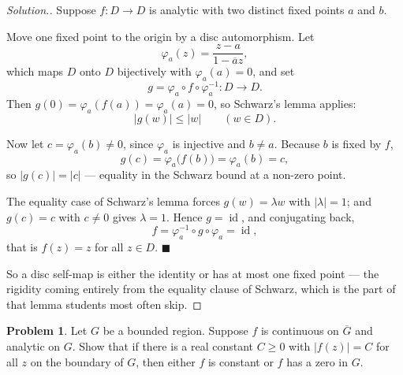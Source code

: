 \documentclass[11pt,a4paper]{article}
\theoremstyle{definition}
\newtheorem{problemx}{Problem}[section]
\newenvironment{problem}{\begin{problemx}}{\end{problemx}}
\newenvironment{solution}
  {\renewcommand{\qedsymbol}{}\begin{proof}[\textit{Solution}.]}
  {\end{proof}}
\begin{document}
\begin{solution}
Suppose $f : D \rightarrow D$ is analytic with two distinct fixed points $a$ and
$b$.

Move one fixed point to the origin by a disc automorphism. Let
$$\varphi_a(z) = \frac{z-a}{1-\overline{a}z},$$
which maps $D$ onto $D$ bijectively with $\varphi_a(a) = 0$, and set
$$g = \varphi_a \circ f \circ \varphi_a^{-1} : D \rightarrow D .$$
Then $g(0) = \varphi_a(f(a)) = \varphi_a(a) = 0$, so Schwarz's lemma applies:
$$\left|g(w)\right| \leq \left|w\right| \qquad (w \in D).$$

Now let $c = \varphi_a(b) \neq 0$, since $\varphi_a$ is injective and $b \neq a$.
Because $b$ is fixed by $f$,
$$g(c) = \varphi_a\big(f(b)\big) = \varphi_a(b) = c ,$$
so $\left|g(c)\right| = \left|c\right|$ --- equality in the Schwarz bound at a
non-zero point.

The equality case of Schwarz's lemma forces $g(w) = \lambda w$ with
$\left|\lambda\right| = 1$; and $g(c) = c$ with $c \neq 0$ gives $\lambda = 1$.
Hence $g = \operatorname{id}$, and conjugating back,
$$f = \varphi_a^{-1}\circ g\circ\varphi_a = \operatorname{id},$$
that is $f(z) = z$ for all $z \in D$. $\blacksquare$

So a disc self-map is either the identity or has at most one fixed point --- the
rigidity coming entirely from the equality clause of Schwarz, which is the part of
that lemma students most often skip.
\end{solution}


\begin{problem}
Let $G$ be a bounded region. Suppose $f$ is continuous on $\overline{G}$ and
analytic on $G$. Show that if there is a real constant $C \geq 0$ with
$\left|f(z)\right| = C$ for all $z$ on the boundary of $G$, then either $f$ is
constant or $f$ has a zero in $G$.
\end{problem}
\end{document}
